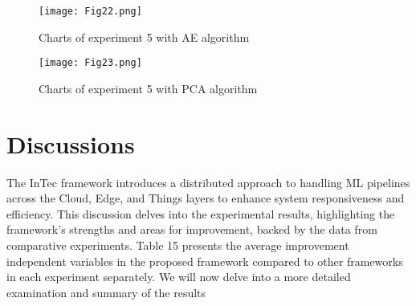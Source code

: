 \documentclass[11pt]{article}
\begin{document}
	\begin{figure}[h]
		\centering
		\texttt{[image: Fig22.png]}
		\caption{Charts of experiment 5 with AE algorithm}
	\end{figure}
	
	\begin{figure}[h]
		\centering
		\texttt{[image: Fig23.png]}
		\caption{Charts of experiment 5 with PCA algorithm}
	\end{figure}
	
	\section{Discussions}
	The InTec framework introduces a distributed approach to handling ML pipelines
	across the Cloud, Edge, and Things layers to enhance system responsiveness and
	efficiency. This discussion delves into the experimental results, highlighting the
	framework’s strengths and areas for improvement, backed by the data from comparative experiments. Table 15 presents the average improvement independent variables in the proposed framework compared to other frameworks in each experiment
	separately. We will now delve into a more detailed examination and summary of the
	results
	
\end{document}
